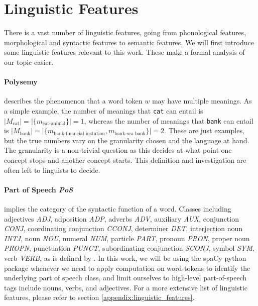 \documentclass[a4paper,12pt,twoside,openright]{report}
\begin{document}
\section{Linguistic Features}

There is a vast number of linguistic features, going from phonological features, morphological and syntactic features to semantic features.
We will first introduce some linguistic features relevant to this work.
These make a formal analysis of our topic easier.

\paragraph{Polysemy} describes the phenomenon that a word token $w$ may have multiple meanings.
As a simple example, the number of meanings that \Verb#cat# can entail is $ | M_\text{cat} | = | \{ m_\text{cat-animal} \} |  = 1$, whereas the number of meanings that \Verb#bank# can entail is $ | M_\text{bank} | = | \{ m_\text{bank-financial instution},  m_\text{bank-sea bank}\} |  = 2$.
These are just examples, but the true numbers vary on the granularity chosen and the language at hand. 
The granularity is a non-trivial question as this decides at what point one concept stops and another concept starts.
This definition and investigation are often left to linguists to decide. \\

\paragraph{Part of Speech \textit{PoS}} implies the category of the syntactic function of a word.
Classes including adjectives \textit{ADJ}, adposition \textit{ADP}, adverbs \textit{ADV}, auxiliary \textit{AUX}, conjunction \textit{CONJ}, coordinating conjunction \textit{CCONJ}, determiner \textit{DET}, interjection noun \textit{INTJ}, noun \textit{NOU}, numeral \textit{NUM}, particle \textit{PART}, pronoun \textit{PRON}, proper noun \textit{PROPN}, punctuation \textit{PUNCT}, subordinating conjunction \textit{SCONJ}, symbol \textit{SYM}, verb \textit{VERB}, as is defined by \cite{spacyb}.
In this work, we will be using the spaCy python package  \cite{spacy} whenever we need to apply computation on word-tokens to identify the underlying part of speech class, and limit ourselves to high-level part-of-speech tags include nouns, verbs, and adjectives.
For a more extensive list of linguistic features, please refer to section \ref{appendix:linguistic_features}.
\end{document}
